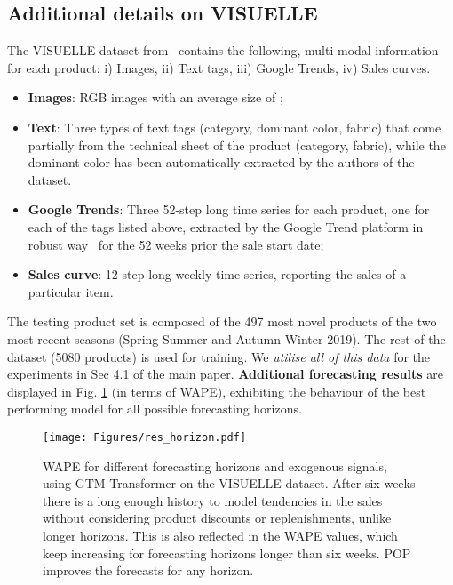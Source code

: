 \documentclass[runningheads]{llncs}
\begin{document}
\subsection{Additional details on VISUELLE}\label{sec:visuelle}
The VISUELLE dataset from~\cite{skenderi2021well} contains the following, multi-modal information for each product: i) Images, ii) Text tags, iii) Google Trends, iv) Sales curves. 
 \begin{itemize}[noitemsep, leftmargin=*]
     \item{\textbf{Images}}: RGB images with an average size of ; 
     \item{\textbf{Text}}: Three types of text tags (category, dominant color, fabric) that come partially from the technical sheet of the product (category, fabric), while the dominant color has been automatically extracted by the authors of the dataset.
     \item{\textbf{Google Trends}}: Three 52-step long time series for each product, one for each of the tags listed above, extracted by the Google Trend platform in robust way~\cite{medeiros2021proper} for the 52 weeks prior the sale start date;
     \item{\textbf{Sales curve}}: 12-step long weekly time series, reporting the sales of a particular item.
 \end{itemize}
 The testing product set is composed of the 497 most novel products of the two most recent seasons (Spring-Summer and Autumn-Winter 2019). The rest of the dataset (5080 products) is used for training. We \emph{utilise all of this data} for the experiments in Sec 4.1 of the main paper.
 \textbf{Additional forecasting results} are displayed in Fig. \ref{fig:result_horizon} (in terms of WAPE), exhibiting the behaviour of the best performing model for all possible forecasting horizons.
 \begin{figure}[h!]
    \centering
    \texttt{[image: Figures/res\_horizon.pdf]}
    \caption{WAPE for different forecasting horizons and exogenous signals, using GTM-Transformer \cite{skenderi2021well} on the VISUELLE dataset. After six weeks there is a long enough history to model tendencies in the sales without considering product discounts or replenishments, unlike longer horizons. This is also reflected in the WAPE values, which keep increasing for forecasting horizons longer than six weeks. POP improves the forecasts for any horizon.}
    \label{fig:result_horizon}
\end{figure}
 
\end{document}
